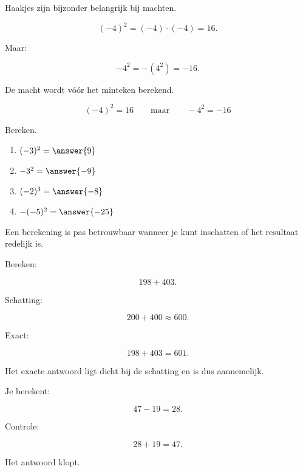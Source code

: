 \documentclass{ximera}
\begin{document}
Haakjes zijn bijzonder belangrijk bij machten.

\[
(-4)^2=(-4)\cdot(-4)=16.
\]

Maar:

\[
-4^2=-(4^2)=-16.
\]

De macht wordt vóór het minteken berekend.

\begin{center}
\[
\boxed{(-4)^2=16 \qquad \text{maar} \qquad -4^2=-16}
\]
\end{center}

\begin{exercise}
Bereken.

\begin{enumerate}
    \item $(-3)^2=\answer{9}$
    \item $-3^2=\answer{-9}$
    \item $(-2)^3=\answer{-8}$
    \item $-(-5)^2=\answer{-25}$
\end{enumerate}
\end{exercise}


Een berekening is pas betrouwbaar wanneer je kunt inschatten of het resultaat
redelijk is.


\begin{example}
Bereken:

\[
198+403.
\]

Schatting:

\[
200+400\approx600.
\]

Exact:

\[
198+403=601.
\]

Het exacte antwoord ligt dicht bij de schatting en is dus aannemelijk.
\end{example}


\begin{example}
Je berekent:

\[
47-19=28.
\]

Controle:

\[
28+19=47.
\]

Het antwoord klopt.
\end{example}
\end{document}
